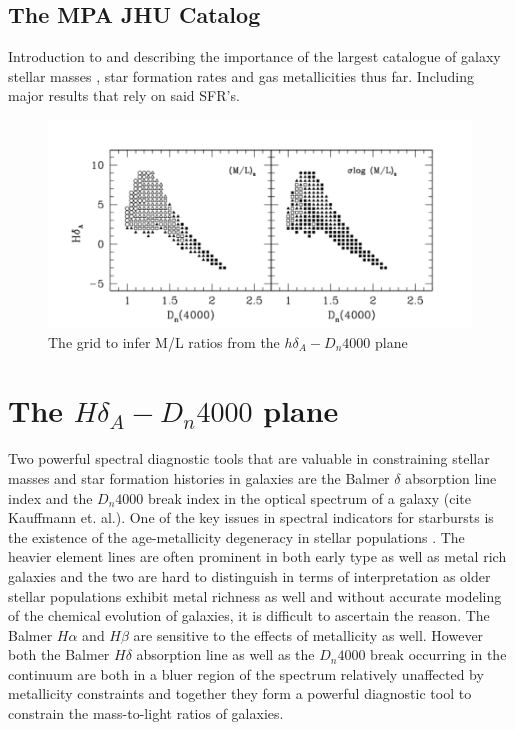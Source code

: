 \subsection{The MPA JHU Catalog}
Introduction to and describing the importance of the largest catalogue of galaxy stellar masses \citep{kauffmann_stellar_2003}, star formation rates \citep{brinchmann_physical_2004} and gas metallicities \citep{tremonti_origin_2004} thus far. Including major results that rely on said SFR's.

\begin{figure}
\includegraphics[width=\textwidth]{figures/Kauffmann_grid}
\caption[Short figure name.]{The \citet{kauffmann_stellar_2003} grid to infer M/L ratios from the $h\delta_{A}-D_{n}4000$ plane
\label{fig:myInlineFigure}}
\end{figure}

\section{The $H\delta_{A}-D_{n}4000$ plane}

Two powerful spectral diagnostic tools that are valuable in constraining stellar masses and star formation histories in galaxies are the Balmer $\delta$ absorption line index and the $D_{n}4000$ break index in the optical spectrum of a galaxy (cite Kauffmann et. al.). One of the key issues in spectral indicators for starbursts is the existence of the age-metallicity degeneracy in stellar populations \citep{worthey_comprehensive_1994}. The heavier element lines are often prominent in both early type as well as metal rich galaxies and the two are hard to distinguish in terms of interpretation as older stellar populations exhibit metal richness as well and without accurate modeling of the chemical evolution of galaxies, it is difficult to ascertain the reason. The Balmer $H\alpha$ and $H\beta$ are sensitive to the effects of metallicity as well. However both the Balmer $H\delta$ absorption line as well as the $D_{n}4000$ break occurring in the continuum are both in a bluer region of the spectrum relatively unaffected by metallicity constraints and together they form a powerful diagnostic tool to constrain the mass-to-light ratios of galaxies. 

